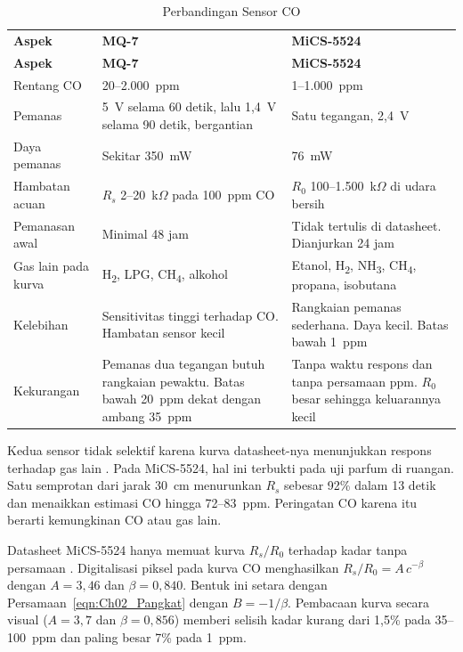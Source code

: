     \begin{longtable}{|L{3.0cm}|L{6.0cm}|L{6.0cm}|}
        \caption{Perbandingan Sensor CO}
        \label{tab:Ch03_Sensor_CO}
        \vspace{-0.75em}\\
        \hline
        \textbf{Aspek} & \textbf{MQ-7 \cite{mq7}} & \textbf{MiCS-5524 \cite{mics5524}} \\ \hline
        \endfirsthead
        \hline
        \textbf{Aspek} & \textbf{MQ-7 \cite{mq7}} & \textbf{MiCS-5524 \cite{mics5524}} \\ \hline
        \endhead
        Rentang CO & 20--2.000~ppm & 1--1.000~ppm \\ \hline
        Pemanas & 5~V selama 60 detik, lalu 1,4~V selama 90 detik, bergantian & Satu tegangan, 2,4~V \\ \hline
        Daya pemanas & Sekitar 350~mW & 76~mW \\ \hline
        Hambatan acuan & $R_s$ 2--20~k$\Omega$ pada 100~ppm CO & $R_0$ 100--1.500~k$\Omega$ di udara bersih \\ \hline
        Pemanasan awal & Minimal 48 jam & Tidak tertulis di datasheet. Dianjurkan 24 jam \cite{adafruit_mics} \\ \hline
        Gas lain pada kurva & H\textsubscript{2}, LPG, CH\textsubscript{4}, alkohol & Etanol, H\textsubscript{2}, NH\textsubscript{3}, CH\textsubscript{4}, propana, isobutana \\ \hline
        Kelebihan & Sensitivitas tinggi terhadap CO. Hambatan sensor kecil & Rangkaian pemanas sederhana. Daya kecil. Batas bawah 1~ppm \\ \hline
        Kekurangan & Pemanas dua tegangan butuh rangkaian pewaktu. Batas bawah 20~ppm dekat dengan ambang 35~ppm & Tanpa waktu respons dan tanpa persamaan ppm. $R_0$ besar sehingga keluarannya kecil \\ \hline
    \end{longtable}

    Kedua sensor tidak selektif karena kurva datasheet-nya menunjukkan respons terhadap gas lain \cite{mq7, mics5524}. Pada MiCS-5524, hal ini terbukti pada uji parfum di ruangan. Satu semprotan dari jarak 30~cm menurunkan $R_s$ sebesar 92\% dalam 13 detik dan menaikkan estimasi CO hingga 72--83~ppm. Peringatan CO karena itu berarti kemungkinan CO atau gas lain.

    Datasheet MiCS-5524 hanya memuat kurva $R_s/R_0$ terhadap kadar tanpa persamaan \cite{mics5524}. Digitalisasi piksel pada kurva CO menghasilkan $R_s/R_0 = A\,c^{-\beta}$ dengan $A = 3{,}46$ dan $\beta = 0{,}840$. Bentuk ini setara dengan Persamaan~\ref{eqn:Ch02_Pangkat} dengan $B = -1/\beta$. Pembacaan kurva secara visual ($A = 3{,}7$ dan $\beta = 0{,}856$) memberi selisih kadar kurang dari 1,5\% pada 35--100~ppm dan paling besar 7\% pada 1~ppm.

